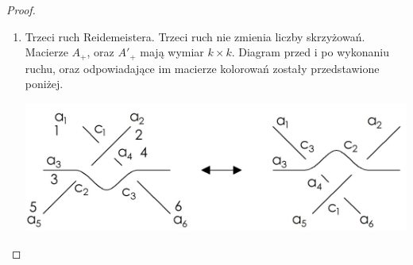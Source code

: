 \begin{proof}
\begin{enumerate}
\begin{center}
			$A'= \begin{pmatrix}
			${\Huge A}$ & \begin{matrix} a_{1,k} \\ \vdots \\ a_{i,k} \\ 0 \\ \vdots
			\\ 0 \end{matrix} & \begin{matrix} 0 \\ \vdots \\ 0 \\ a_{i+1,k} \\ \vdots
			\\ a_{k-1,k} \end{matrix}
	 		\\ \begin{matrix} a_{k,1} & \cdots  & a_{k,i}  & \cdots & a_{k,k-1} \end{matrix} & 0 & a_{k,k}
	 		\\ \begin{matrix} 0 & \cdots & 0 & -2 & 0 & \cdots & 0 \end{matrix} & 1 & 0 


			\end{pmatrix}$

		
\end{center}

Po wykonaniu na macierzy $A'$ następujących operacji: dodanie do ostatniej (k+1) kolumny sumy pozostałych kolumn, oraz dodanie do przedostatniego wiersza (k) sumy wierszy od 1 do k-1, oraz zastosowaniu rozwinięcia Laplace'a otrzymamy $\vert det \big( A' \big) \vert = \vert det \big( A \big) \vert$. Macierz diagonalna ma postać $\lbrace 1, 1, \vert d_{1} \vert, \cdots, \vert d_{k} \vert \rbrace$. Argumentacja jest analogiczna jak w pierwszym ruchu Reidemeistera.
 
 \item Trzeci ruch Reidemeistera. Trzeci ruch nie zmienia liczby skrzyżowań. Macierze $A_{+}$, oraz $A'_{+}$ mają wymiar $k \times k$. Diagram przed i po wykonaniu ruchu, oraz odpowiadające im macierze kolorowań zostały przedstawione poniżej.
 
 \begin{center}
 			\includegraphics[scale=0.3]{2/Obrazy/R3det}
 \end{center}


\end{enumerate}
\end{proof}
